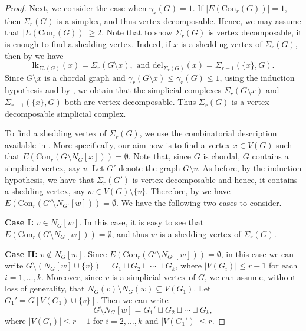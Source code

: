 \documentclass[12pt,reqno]{amsart}
\theoremstyle{definition}
\newcommand{\lk}{{\mathrm{lk}}}
\newcommand{\del}{{\mathrm{del}}}
\newcommand{\Con}{{\mathrm{Con}}}
\def\del{\mathrm{del}}
\begin{document}
\begin{proof}
		Next, we consider the case when $\gamma_r(G) = 1$. If $|E(\Con_r(G))|=1$, then $\Sigma_{r}(G)$ is a simplex, and thus vertex decomposable. Hence, we may assume that $|E(\Con_r(G))|\ge 2$. Note that to show $\Sigma_r(G)$ is vertex decomposable, it is enough to find a shedding vertex. Indeed, if $x$ is a shedding vertex of $\Sigma_{r}(G)$, then by  we have
		\[
		\lk_{\Sigma_{r}(G)}(x)=\Sigma_r(G\setminus x), \text{ and } \del_{\Sigma_{r}(G)}(x)=\Sigma_{r-1}(\{x\},G).
		\]
		Since $G\setminus x$ is a chordal graph and $\gamma_r(G\setminus x)\le\gamma_r(G)\le 1$, using the induction hypothesis and by , we obtain that the simplicial complexes $\Sigma_r(G\setminus x)$ and $\Sigma_{r-1}(\{x\},G)$ both are vertex decomposable. Thus $\Sigma_{r}(G)$ is a vertex decomposable simplicial complex.
		
		To find a shedding vertex of $\Sigma_{r}(G)$, we use the combinatorial description available in . More specifically, our aim now is to find a vertex $x \in V(G)$ such that
		$E(\Con_r(G \setminus N_G[x])) = \emptyset$. Note that, since $G$ is chordal, $G$ contains a simplicial vertex, say $v$. Let $G'$ denote the graph $G\setminus v$. As before, by the induction hypothesis, we have that $\Sigma_{r}(G')$ is vertex decomposable and hence, it contains a shedding vertex, say $w\in V(G)\setminus\{v\}$. Therefore, by  we have $E(\Con_r(G' \setminus N_{G'}[w])) = \emptyset$. We have the following two cases to consider.
		
		\medskip
		\noindent
		{\bf Case I: } $v\in N_G[w]$. In this case, it is easy to see that $E(\Con_r\left(G \setminus N_G[w]\right)) = \emptyset$, and thus $w$ is a shedding vertex of $\Sigma_{r}(G)$. 
		
		\medskip
		\noindent
		{\bf Case II: } $v\notin N_G[w]$. Since $E(\Con_r(G' \setminus N_{G'}[w])) = \emptyset$, in this case we can write $G \setminus (N_G[w] \cup \{v\}) = G_1 \sqcup G_2 \sqcup \cdots \sqcup G_k$, where $|V(G_i)| \leq r - 1$ for each $i=1,\ldots,k$. Moreover, since $v$ is a simplicial vertex of $G$, we can assume, without loss of generality, that $N_G(v) \setminus N_G(w) \subseteq V(G_1)$. Let $G_1'=G[V(G_1)\cup\{v\}]$. Then we can write 
        \[
        G \setminus N_G[w] = G_1' \sqcup G_2 \sqcup \cdots \sqcup G_k,
        \]
        where $|V(G_i)| \leq r - 1$ for $i = 2,\ldots,k$ and $|V(G_1')| \leq r$.
		

\end{proof}
\end{document}
